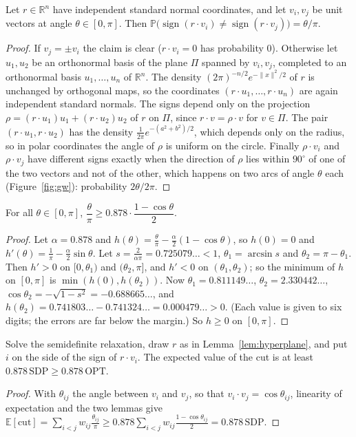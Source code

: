 \begin{lemma}\label{lem:hyperplane}
Let $r\in\mathbb R^n$ have independent standard normal coordinates, and let $v_i,v_j$ be unit vectors at angle $\theta\in[0,\pi]$. Then $\mathbb P\bigl(\operatorname{sign}(r\cdot v_i)\ne\operatorname{sign}(r\cdot v_j)\bigr)=\theta/\pi$.
\end{lemma}
\begin{proof}
If $v_j=\pm v_i$ the claim is clear ($r\cdot v_i=0$ has probability $0$). Otherwise let $u_1,u_2$ be an orthonormal basis of the plane $\Pi$ spanned by $v_i,v_j$, completed to an orthonormal basis $u_1,\dots,u_n$ of $\mathbb R^n$. The density $(2\pi)^{-n/2}e^{-\|x\|^2/2}$ of $r$ is unchanged by orthogonal maps, so the coordinates $(r\cdot u_1,\dots,r\cdot u_n)$ are again independent standard normals.
The signs depend only on the projection $\rho=(r\cdot u_1)u_1+(r\cdot u_2)u_2$ of $r$ on $\Pi$, since $r\cdot v=\rho\cdot v$ for $v\in\Pi$. The pair $(r\cdot u_1,r\cdot u_2)$ has the density $\frac1{2\pi}e^{-(a^2+b^2)/2}$, which depends only on the radius, so in polar coordinates the angle of $\rho$ is uniform on the circle. Finally $\rho\cdot v_i$ and $\rho\cdot v_j$ have different signs exactly when the direction of $\rho$ lies within $90^\circ$ of one of the two vectors and not of the other, which happens on two arcs of angle $\theta$ each (Figure~\ref{fig:gw}): probability $2\theta/2\pi$.
\end{proof}

\begin{lemma}\label{lem:gwconstant}
For all $\theta\in[0,\pi]$, $\dfrac\theta\pi\ge0.878\cdot\dfrac{1-\cos\theta}2$.
\end{lemma}
\begin{proof}
Let $\alpha=0.878$ and $h(\theta)=\frac\theta\pi-\frac\alpha2(1-\cos\theta)$, so $h(0)=0$ and $h'(\theta)=\frac1\pi-\frac\alpha2\sin\theta$. Let $s=\frac2{\alpha\pi}=0.725079\ldots<1$, $\theta_1=\arcsin s$ and $\theta_2=\pi-\theta_1$. Then $h'>0$ on $[0,\theta_1)$ and $(\theta_2,\pi]$, and $h'<0$ on $(\theta_1,\theta_2)$; so the minimum of $h$ on $[0,\pi]$ is $\min(h(0),h(\theta_2))$.
Now $\theta_1=0.811149\ldots$, $\theta_2=2.330442\ldots$, $\cos\theta_2=-\sqrt{1-s^2}=-0.688665\ldots$, and $h(\theta_2)=0.741803\ldots-0.741324\ldots=0.000479\ldots>0$. (Each value is given to six digits; the errors are far below the margin.) So $h\ge0$ on $[0,\pi]$.
\end{proof}

\begin{theorem}\label{thm:gw}
Solve the semidefinite relaxation, draw $r$ as in Lemma~\ref{lem:hyperplane}, and put $i$ on the side of the sign of $r\cdot v_i$. The expected value of the cut is at least $0.878\,\mathrm{SDP}\ge0.878\,\mathrm{OPT}$.
\end{theorem}
\begin{proof}
With $\theta_{ij}$ the angle between $v_i$ and $v_j$, so that $v_i\cdot v_j=\cos\theta_{ij}$, linearity of expectation and the two lemmas give
$\mathbb E[\text{cut}]=\sum_{i<j}w_{ij}\frac{\theta_{ij}}\pi\ge0.878\sum_{i<j}w_{ij}\frac{1-\cos\theta_{ij}}2=0.878\,\mathrm{SDP}$.
\end{proof}

